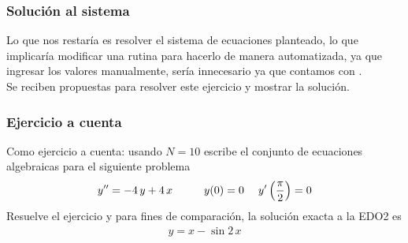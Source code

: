 \begin{frame}
\frametitle{Solución al sistema}
Lo que nos restaría es resolver el sistema de ecuaciones planteado, lo que implicaría modificar una rutina para hacerlo de manera automatizada, ya que ingresar los valores manualmente, sería innecesario ya que contamos con \python.
\\
\bigskip
\pause
Se reciben propuestas para resolver este ejercicio y mostrar la solución.
\end{frame}
\begin{frame}
\frametitle{Ejercicio a cuenta}
Como ejercicio a cuenta: usando $N=10$ escribe el conjunto de ecuaciones algebraicas para el siguiente problema
\begin{align*}
{y}^{\prime \prime} = -4 \, y + 4 \, x \hspace{1cm} y(0) = 0 \hspace{0.45cm} {y}^{\prime} \left( \dfrac{\pi}{2} \right) = 0
\end{align*}
Resuelve el ejercicio y para fines de comparación, la solución exacta a la EDO2 es
\begin{align*}
y = x - \sin 2 \, x
\end{align*}
\end{frame}
